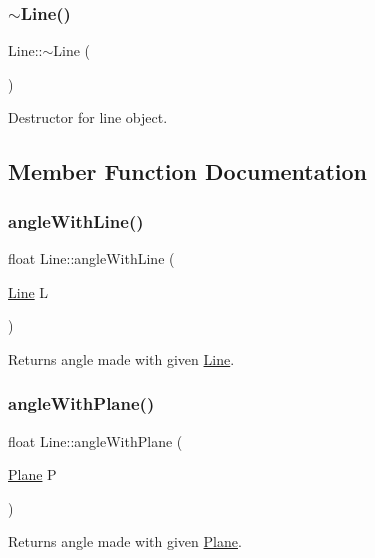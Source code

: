\subsubsection{\texorpdfstring{$\sim$\+Line()}{~Line()}}
{\footnotesize\ttfamily Line\+::$\sim$\+Line (\begin{DoxyParamCaption}{ }\end{DoxyParamCaption})}



Destructor for line object. 



\subsection{Member Function Documentation}
\mbox{\label{class_line_aefe5ec3e42ab38c1f60e65ca09f0fd29}} 
\subsubsection{\texorpdfstring{angle\+With\+Line()}{angleWithLine()}}
{\footnotesize\ttfamily float Line\+::angle\+With\+Line (\begin{DoxyParamCaption}\item[{\mbox{\hyperlink{class_line}{Line}}}]{L }\end{DoxyParamCaption})}



Returns angle made with given \mbox{\hyperlink{class_line}{Line}}. 

\mbox{\label{class_line_abd11dc16386ee1d5424deac55dea0d1b}} 
\subsubsection{\texorpdfstring{angle\+With\+Plane()}{angleWithPlane()}}
{\footnotesize\ttfamily float Line\+::angle\+With\+Plane (\begin{DoxyParamCaption}\item[{\mbox{\hyperlink{class_plane}{Plane}}}]{P }\end{DoxyParamCaption})}



Returns angle made with given \mbox{\hyperlink{class_plane}{Plane}}. 

